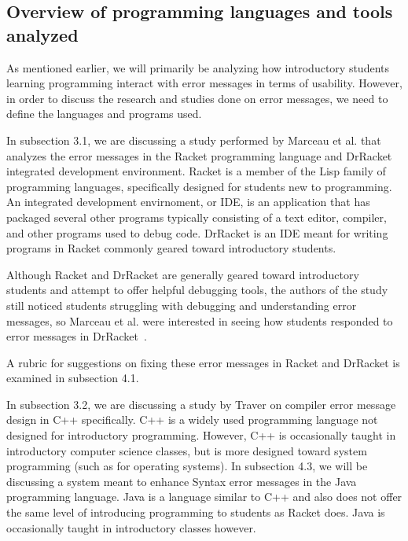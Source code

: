 \documentclass{sig-alternate}
\begin{document}


\subsection{Overview of programming languages and tools analyzed}

As mentioned earlier, we will primarily be analyzing how introductory students learning programming interact with error messages in terms of usability.
However, in order to discuss the research and studies done on error messages, we need to define the languages and programs used.  

In subsection 3.1, we are discussing a study performed by Marceau et al. that analyzes the error messages in the Racket programming language and DrRacket integrated development environment.
Racket is a member of the Lisp family of programming languages, specifically designed for students new to programming.
An integrated development envirnoment, or IDE, is an application that has packaged several other programs typically consisting of a text editor, compiler, and other programs used to debug code.
DrRacket is an IDE meant for writing programs in Racket commonly geared toward introductory students.

Although Racket and DrRacket are generally geared toward introductory students and attempt to offer helpful debugging tools, the authors of the study still noticed students struggling with debugging and understanding error messages, so Marceau et al. were interested in seeing how students responded to error messages in DrRacket~\cite{Marceau:2011:MYL:2048237.2048241}.


A rubric for suggestions on fixing these error messages in Racket and DrRacket is examined in subsection 4.1.

In subsection 3.2, we are discussing a study by Traver on compiler error message design in C++ specifically.
C++ is a widely used programming language not designed for introductory programming. However, C++ is occasionally taught in introductory computer science classes, but is more designed toward system programming (such as for operating systems). In subsection 4.3, we will be discussing a system meant to enhance Syntax error messages in the Java programming language.
Java is a language similar to C++ and also does not offer the same level of introducing programming to students as Racket does.
Java is occasionally taught in introductory classes however.  
\end{document}
